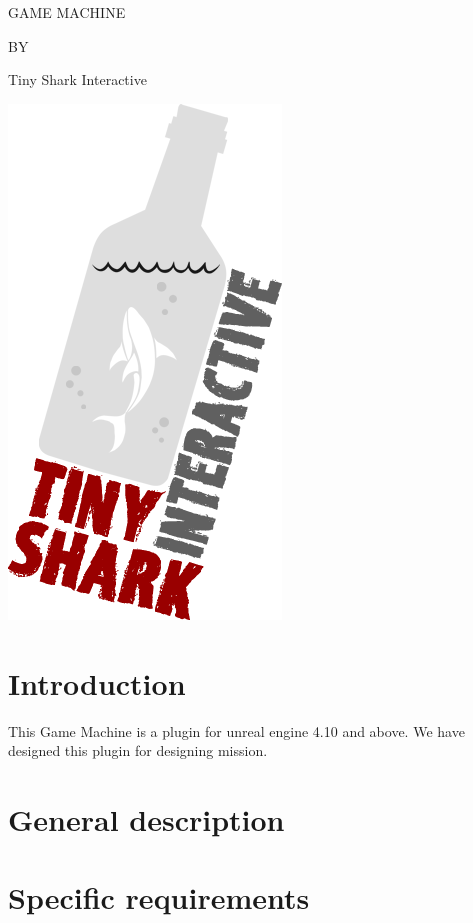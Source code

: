 \documentclass[12pt]{article}
\begin{document}
\pagecolor{TSIBlack}
\color{white}
\begin{titlepage}
\begin{center}
\huge GAME MACHINE
\end{center}
\begin{center}
 BY
\end{center}
\begin{center}
\huge Tiny Shark Interactive
\end{center}
\begin{center}
\includegraphics[scale=0.6]{banner.png}
\end{center}
\end{titlepage}
\tableofcontents
\pagebreak
\section{Introduction}
This Game Machine is a plugin for unreal engine 4.10 and above.
We have designed this plugin for designing mission.
\section{General description}
\section{Specific requirements}
\end{document}
